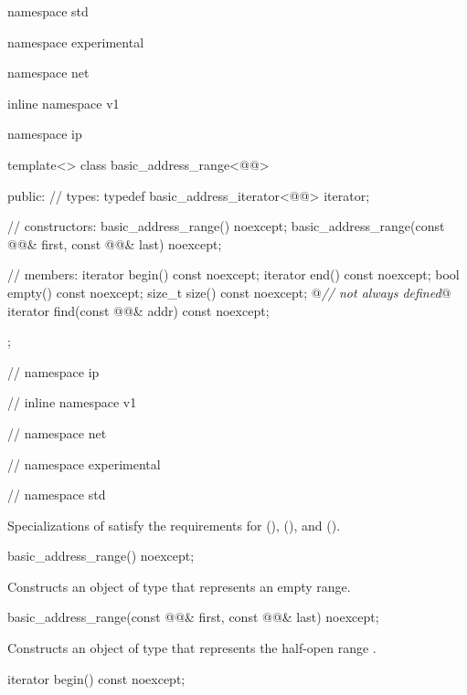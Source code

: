\begin{codeblock}
namespace std {
namespace experimental {
namespace net {
inline namespace v1 {
namespace ip {

  template<> class basic_address_range<@@>
  {
  public:
    // types:
    typedef basic_address_iterator<@@> iterator;

    // constructors:
    basic_address_range() noexcept;
    basic_address_range(const @@& first,
                        const @@& last) noexcept;

    // members:
    iterator begin() const noexcept;
    iterator end() const noexcept;
    bool empty() const noexcept;
    size_t size() const noexcept; @\textit{// not always defined}@
    iterator find(const @@& addr) const noexcept;
  };

} // namespace ip
} // inline namespace v1
} // namespace net
} // namespace experimental
} // namespace std
\end{codeblock}

\pnum
Specializations of  satisfy the requirements for  (),  (), and  ().

\begin{itemdecl}
basic_address_range() noexcept;
\end{itemdecl}

\begin{itemdescr}
\pnum
\effects Constructs an object of type  that represents an empty range.
\end{itemdescr}

\begin{itemdecl}
basic_address_range(const @@& first,
                    const @@& last) noexcept;
\end{itemdecl}

\begin{itemdescr}
\pnum
\effects Constructs an object of type  that represents the half-open range .
\end{itemdescr}

\begin{itemdecl}
iterator begin() const noexcept;
\end{itemdecl}

